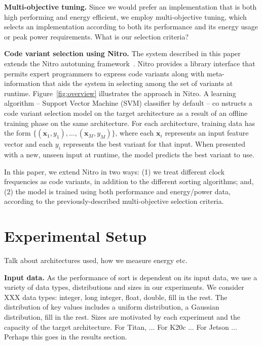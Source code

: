 \documentclass{sig-alternate}
\begin{document}
\noindent
{\bf Multi-objective tuning.}
Since we would prefer an implementation that is both high performing and
energy efficient, we employ multi-objective tuning, which selects an 
implementation according to both its performance and its energy usage or
peak power requirements.  
{\color{red}What is our selection criteria?}

\noindent
{\bf Code variant selection using Nitro.}
The system described in this paper extends
the Nitro autotuning framework~\cite{muralidharan:2014}.
Nitro provides a library interface that permits expert programmers to
express code variants along with meta-information that aids
the system in selecting among the set of variants at runtime.
Figure~\ref{fig:overview} illustrates the approach in Nitro.  
A learning algorithm -- Support Vector Machine (SVM) classifier by default -- co
nstructs a 
code variant selection
model on the target architecture as a result of an offline training phase on the
 same architecture.
For each architecture, training data has the form
$\{(\mathbf{x}_1, y_1), \hdots, (\mathbf{x}_M, y_M)\}$, where
each $\mathbf{x}_i$ represents an input feature vector and each
$y_i$ represents the best variant for that input.
When presented with a new, unseen input at runtime, the model
predicts the best variant to use. 

In this paper, we extend Nitro in two ways: (1) we treat 
different clock frequencies as code variants, in addition to the
different sorting algorithms; and, (2) the model is trained
using both performance and energy/power data, according to the 
previously-described multi-objective selection criteria.

\section{Experimental Setup}

{\color{red} Talk about architectures used, how we measure energy etc.}

\noindent
{\bf Input data.}
As the performance of sort is dependent on its input data, we 
use a variety of data types, distributions and sizes in our experiments.
We consider XXX data types: 
integer, long integer, float, double, {\color{red} fill in
the rest.}
The distribution of key values 
includes a uniform distribution, a Gaussian distribution, 
{\color{red} fill in
the rest.}
Sizes are motivated by each experiment and the capacity of the
target architecture.  {\color{red} For Titan, ...  
For K20c ... For Jetson ...  Perhaps this goes in the results section.}
\end{document}
